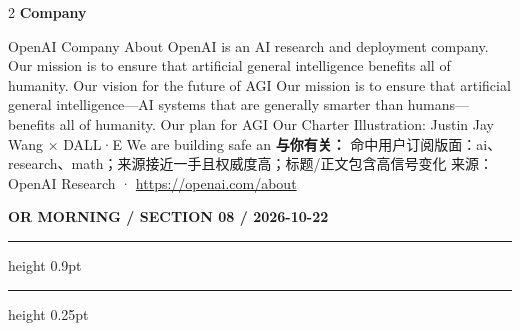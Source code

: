 \documentclass[10.5pt]{ctexart}
\begin{document}
\begin{multicols}{2}
\vspace{2mm}
{\large\bfseries Company}\par
OpenAI Company About OpenAI is an AI research and deployment company. Our mission is to ensure that artificial general intelligence benefits all of humanity. Our vision for the future of AGI Our mission is to ensure that artificial general intelligence—AI systems that are generally smarter than humans—benefits all of humanity. Our plan for AGI Our Charter Illustration: Justin Jay Wang × DALL·E We are building safe an
\textbf{与你有关：} 命中用户订阅版面：ai、research、math；来源接近一手且权威度高；标题/正文包含高信号变化
{\footnotesize\color{ormuted} 来源：OpenAI Research · \url{https://openai.com/about}}
\end{multicols}
\newpage
{\small\bfseries OR MORNING / SECTION 08 / 2026-10-22}
\vspace{2mm}
\hrule height 0.9pt
\vspace{1.5mm}
\hrule height 0.25pt
\vspace{4mm}
\end{document}
